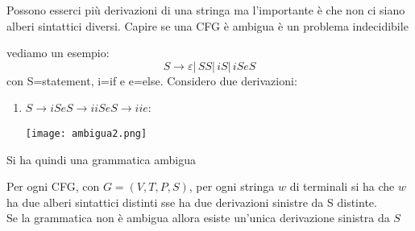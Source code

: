 Possono esserci più derivazioni di una stringa ma l'importante è che non ci siano alberi sintattici diversi. Capire se una CFG è ambigua è un problema indecidibile
\begin{example}
	vediamo un esempio:
	$$S\to \varepsilon|\,SS|\, iS|\, iSeS$$
	con S=statement, i=if e e=else. Considero due derivazioni:
	\begin{enumerate}
		\item $S\to iSeS\to iiSeS\to iie$:
					\begin{center}
\texttt{[image: ambigua2.png]}

%
					\end{center}
	\end{enumerate}
	Si ha quindi una grammatica ambigua
\end{example}
\begin{theorem}
	Per ogni CFG, con $G=(V, T, P, S)$, per ogni stringa $w$ di terminali si ha che $w$ ha due alberi sintattici distinti sse ha due derivazioni sinistre da S distinte.\\
	Se la grammatica non è ambigua allora esiste un'unica derivazione sinistra da $S$
\end{theorem}
